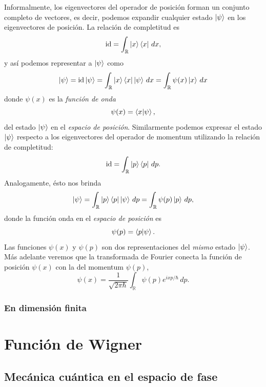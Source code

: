 \documentclass[a4paper]{report}
\DeclareMathOperator{\R}{\mathbb{R}}
\let\H\relax
\DeclareMathOperator{\H}{\mathcal H}
\DeclareMathOperator{\id}{id}
\begin{document}
  Informalmente, los eigenvectores del operador de posición
  forman un conjunto completo de vectores, es decir, podemos
  expandir cualquier estado $\ket \psi$ en los eigenvectores de
  posición. La relación de completitud es
  \[
    \id_{\H}
    = \int_{\R} \ket x \bra x \, dx, 
  \] 
  y así podemos representar a $\ket \psi$ como
  \begin{equation}
    \ket \psi
    = \id_{\H} \ket \psi
    = \int_{\R} \ket x \bra x \ket \psi \, dx
    = \int_{\R} \psi(x) \ket x \, dx
  \end{equation}
  donde $\psi(x)$ es la \textit{función de onda} 
  \begin{equation}
    \psi(x)
    = \braket{x|\psi},
  \end{equation}
  del estado $\ket \psi$ en el \textit{espacio de posición}.
  Similarmente podemos expresar el estado $\ket \psi$ 
  respecto a los eigenvectores del operador de momentum
  utilizando la relación de completitud:
  \[
    \id_{\H}
    = \int_{\R} \ket p \bra p \, dp.
  \] 
  Analogamente, ésto nos brinda
  \begin{equation}
    \ket \psi
    = \int_{\R} \ket p \bra p \ket \psi \, dp
    = \int_{\R} \psi(p) \ket p \, dp,
  \end{equation}
  donde la función onda en el \textit{espacio de posición}
  es
  \begin{equation}
    \psi(p)
    = \braket{p|\psi}.
  \end{equation}
  Las funciones $\psi(x)$ y $\psi(p)$ son dos
  representaciones del \textit{mismo} estado $\ket \psi$.
  Más adelante veremos que la transformada de Fourier
  conecta la función de posición $\psi(x)$ con la del
  momentum $\psi(p)$, 
  \begin{equation}
    \psi(x)
    = \frac{1}{\sqrt{2\pi\hbar}} \int_{\R} \psi(p)e^{ixp /
    \hbar} \, dp.
  \end{equation} 

  \subsection{En dimensión finita}

  \chapter{Función de Wigner}

  \section{Mecánica cuántica en el espacio de fase}
\end{document}
